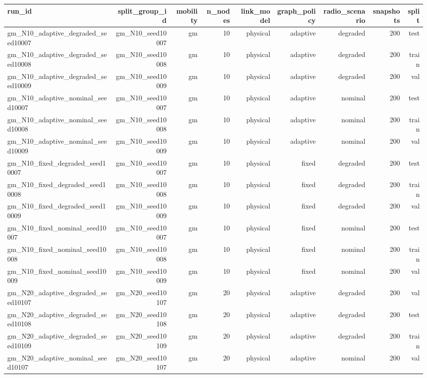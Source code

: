 \begin{tabular}{lrrrrrrrr}
\toprule
run\_id & split\_group\_id & mobility & n\_nodes & link\_model & graph\_policy & radio\_scenario & snapshots & split \\
\midrule
gm\_N10\_adaptive\_degraded\_seed10007 & gm\_N10\_seed10007 & gm & 10 & physical & adaptive & degraded & 200 & test \\
gm\_N10\_adaptive\_degraded\_seed10008 & gm\_N10\_seed10008 & gm & 10 & physical & adaptive & degraded & 200 & train \\
gm\_N10\_adaptive\_degraded\_seed10009 & gm\_N10\_seed10009 & gm & 10 & physical & adaptive & degraded & 200 & val \\
gm\_N10\_adaptive\_nominal\_seed10007 & gm\_N10\_seed10007 & gm & 10 & physical & adaptive & nominal & 200 & test \\
gm\_N10\_adaptive\_nominal\_seed10008 & gm\_N10\_seed10008 & gm & 10 & physical & adaptive & nominal & 200 & train \\
gm\_N10\_adaptive\_nominal\_seed10009 & gm\_N10\_seed10009 & gm & 10 & physical & adaptive & nominal & 200 & val \\
gm\_N10\_fixed\_degraded\_seed10007 & gm\_N10\_seed10007 & gm & 10 & physical & fixed & degraded & 200 & test \\
gm\_N10\_fixed\_degraded\_seed10008 & gm\_N10\_seed10008 & gm & 10 & physical & fixed & degraded & 200 & train \\
gm\_N10\_fixed\_degraded\_seed10009 & gm\_N10\_seed10009 & gm & 10 & physical & fixed & degraded & 200 & val \\
gm\_N10\_fixed\_nominal\_seed10007 & gm\_N10\_seed10007 & gm & 10 & physical & fixed & nominal & 200 & test \\
gm\_N10\_fixed\_nominal\_seed10008 & gm\_N10\_seed10008 & gm & 10 & physical & fixed & nominal & 200 & train \\
gm\_N10\_fixed\_nominal\_seed10009 & gm\_N10\_seed10009 & gm & 10 & physical & fixed & nominal & 200 & val \\
gm\_N20\_adaptive\_degraded\_seed10107 & gm\_N20\_seed10107 & gm & 20 & physical & adaptive & degraded & 200 & val \\
gm\_N20\_adaptive\_degraded\_seed10108 & gm\_N20\_seed10108 & gm & 20 & physical & adaptive & degraded & 200 & test \\
gm\_N20\_adaptive\_degraded\_seed10109 & gm\_N20\_seed10109 & gm & 20 & physical & adaptive & degraded & 200 & train \\
gm\_N20\_adaptive\_nominal\_seed10107 & gm\_N20\_seed10107 & gm & 20 & physical & adaptive & nominal & 200 & val \\

\end{tabular}
